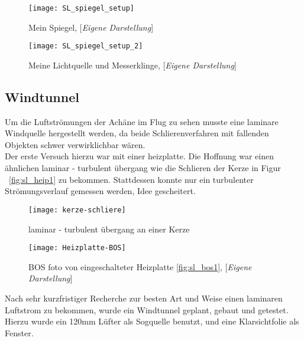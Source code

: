 \newpage
\begin{figure}[h]
    \centering
    \begin{minipage}{0.5\textwidth}
        \centering
        \texttt{[image: SL\_spiegel\_setup]}
        \caption{Mein Spiegel, [\textit{Eigene Darstellung}]}
    \end{minipage}
    \hfill
    \begin{minipage}{0.4\textwidth}
        \centering
        \texttt{[image: SL\_spiegel\_setup\_2]}
        \caption{Meine Lichtquelle und Messerklinge, [\textit{Eigene Darstellung}]}
    \end{minipage}
    \label{fig:sl_spi}
\end{figure}
\newpage

\subsection{Windtunnel}\label{subsec:windtunnel}

Um die Luftströmungen der Achäne im Flug zu sehen musste eine laminare Windquelle hergestellt werden,
da beide Schlierenverfahren mit fallenden Objekten schwer verwirklichbar wären.\\
Der erste Versuch hierzu war mit einer heizplatte.
Die Hoffnung war einen ähnlichen laminar - turbulent übergang wie die Schlieren der Kerze in Figur ~\ref{fig:sl_heip1} zu bekommen.
Stattdessen konnte nur ein turbulenter Strömungsverlauf gemessen werden, Idee gescheitert.\\

\begin{figure}[h]
    \centering
    \begin{minipage}{0.3\textwidth}
        \centering
        \texttt{[image: kerze-schliere]}
        \caption{laminar - turbulent übergang an einer Kerze \cite{kerze-schliere}}
        \label{fig:sl_heip1}
    \end{minipage}
    \hfill
    \begin{minipage}{0.6\textwidth}
        \centering
        \texttt{[image: Heizplatte-BOS]}
        \caption{BOS foto von eingeschalteter Heizplatte \ref{fig:sl_bos1}, [\textit{Eigene Darstellung}]}
        \label{fig:sl_heip2}
    \end{minipage}
\end{figure}

\noindent
Nach sehr kurzfristiger Recherche zur besten Art und Weise einen laminaren Luftstrom zu bekommen,
wurde ein Windtunnel geplant, gebaut und getestet.
Hierzu wurde ein 120mm Lüfter als Sogquelle benutzt, und eine Klarsichtfolie als Fenster.


